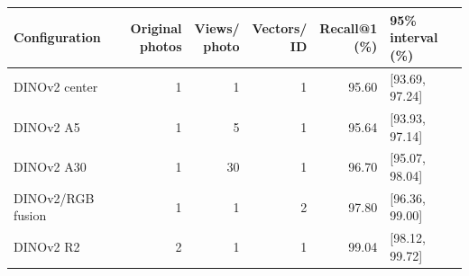 \begin{tabular}{lrrrrl}
\toprule
Configuration & \makecell{Original\\photos} & \makecell{Views/\\photo} & \makecell{Vectors/\\ID} & \makecell{Recall@1\\(\%)} & \makecell{95\% interval\\(\%)} \\
\midrule
DINOv2 center & 1 & 1 & 1 & 95.60 & [93.69, 97.24] \\
DINOv2 A5 & 1 & 5 & 1 & 95.64 & [93.93, 97.14] \\
DINOv2 A30 & 1 & 30 & 1 & 96.70 & [95.07, 98.04] \\
DINOv2/RGB fusion & 1 & 1 & 2 & 97.80 & [96.36, 99.00] \\
DINOv2 R2 & 2 & 1 & 1 & 99.04 & [98.12, 99.72] \\
\bottomrule
\end{tabular}
